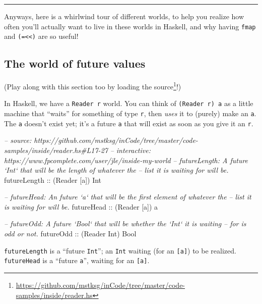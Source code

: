 \documentclass[]{article}
\newenvironment{Shaded}{}{}
\newcommand{\DataTypeTok}[1]{\textcolor[rgb]{0.56,0.13,0.00}{{#1}}}
\newcommand{\CommentTok}[1]{\textcolor[rgb]{0.38,0.63,0.69}{\textit{{#1}}}}
\newcommand{\OtherTok}[1]{\textcolor[rgb]{0.00,0.44,0.13}{{#1}}}
\newcommand{\NormalTok}[1]{{#1}}
\renewcommand{\href}[2]{#2\footnote{\url{#1}}}
\begin{document}
\begin{center}\rule{0.5\linewidth}{\linethickness}\end{center}

Anyways, here is a whirlwind tour of different worlds, to help you
realize how often you'll actually want to live in these worlds in
Haskell, and why having \texttt{fmap} and
\texttt{(=\textless{}\textless{})} are so useful!

\subsection{The world of future
values}\label{the-world-of-future-values}

(Play along with this section too by
\href{https://github.com/mstksg/inCode/tree/master/code-samples/inside/reader.hs}{loading
the source}!)

In Haskell, we have a \texttt{Reader\ r} world. You can think of
\texttt{(Reader\ r)\ a} as a little machine that ``waits'' for something
of type \texttt{r}, then \emph{uses} it to (purely) make an \texttt{a}.
The \texttt{a} doesn't exist yet; it's a future \texttt{a} that will
exist as soon as you give it an \texttt{r}.

\begin{Shaded}
\begin{Highlighting}[]
\CommentTok{-- source: https://github.com/mstksg/inCode/tree/master/code-samples/inside/reader.hs#L17-27}
\CommentTok{-- interactive: https://www.fpcomplete.com/user/jle/inside-my-world}
\CommentTok{-- futureLength: A future `Int` that will be the length of whatever the}
\CommentTok{--      list it is waiting for will be.}
\OtherTok{futureLength ::} \NormalTok{(}\DataTypeTok{Reader} \NormalTok{[a]) }\DataTypeTok{Int}

\CommentTok{-- futureHead: An future `a` that will be the first element of whatever the}
\CommentTok{--      list it is waiting for will be.}
\OtherTok{futureHead   ::} \NormalTok{(}\DataTypeTok{Reader} \NormalTok{[a]) a}

\CommentTok{-- futureOdd: A future `Bool` that will be whether the `Int` it is waiting}
\CommentTok{--      for is odd or not.}
\OtherTok{futureOdd    ::} \NormalTok{(}\DataTypeTok{Reader} \DataTypeTok{Int}\NormalTok{) }\DataTypeTok{Bool}
\end{Highlighting}
\end{Shaded}

\texttt{futureLength} is a ``future \texttt{Int}''; an \texttt{Int}
waiting (for an \texttt{{[}a{]}}) to be realized. \texttt{futureHead} is
a ``future \texttt{a}'', waiting for an \texttt{{[}a{]}}.
\end{document}
